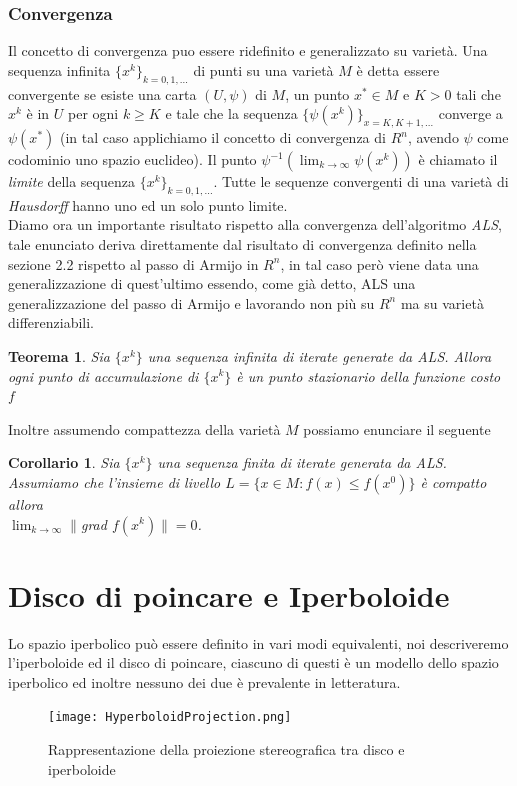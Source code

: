 \documentclass[a4paper, 12pt]{article}
\newtheorem{theorem}{Teorema}
\newtheorem{corollary}{Corollario}
\begin{document}
\subsubsection{Convergenza}
Il concetto di convergenza puo essere ridefinito e generalizzato su varietà. Una sequenza infinita $\{x^k\}_{k=0,1,...}$ di punti su una varietà $M$ è detta essere convergente se esiste una carta $(U, \psi)$ di $M$, un punto $x^\ast \in M$ e $K > 0$ tali che $x^k$ è in $U$ per ogni $k \geq K$ e tale che la sequenza $\{\psi(x^k)\}_{x=K, K+1, ...}$ converge a $\psi(x^\ast)$ (in tal caso applichiamo il concetto di convergenza di $R^n$, avendo $\psi$ come codominio uno spazio euclideo). Il punto $\psi^{-1}(\lim_{k \to \infty} \psi(x^k))$ è chiamato il \emph{limite} della sequenza $\{x^k\}_{k=0,1,...}$. Tutte le sequenze convergenti di una varietà di \emph{Hausdorff} hanno uno ed un solo punto limite.\\
Diamo ora un importante risultato rispetto alla convergenza dell'algoritmo \emph{ALS}, tale enunciato deriva direttamente dal risultato di convergenza definito nella sezione 2.2 rispetto al passo di Armijo in $R^n$, in tal caso però viene data una generalizzazione di quest'ultimo essendo, come già detto, ALS una generalizzazione del passo di Armijo e lavorando non più su $R^n$ ma su varietà differenziabili.
\begin{theorem}
Sia $\{x^k\}$ una sequenza infinita di iterate generate da ALS. Allora ogni punto di accumulazione  di $\{x^k\}$ è un punto stazionario della funzione costo $f$
\end{theorem}
Inoltre assumendo compattezza della varietà $M$ possiamo enunciare il seguente
\begin{corollary}
Sia $\{x^k\}$ una sequenza finita di iterate generata da ALS. Assumiamo che l'insieme di livello $L = \{x \in M : f(x) \leq f(x^0)\}$ è compatto allora\\ $\lim_{k \to \infty} \parallel $grad $f(x^k) \parallel = 0$.
\end{corollary}

\section{Disco di poincare e Iperboloide}
Lo spazio iperbolico può essere definito in vari modi equivalenti, noi descriveremo l'iperboloide ed il disco di poincare, ciascuno di questi è un modello dello spazio iperbolico ed inoltre nessuno dei due è prevalente in letteratura.\\
\begin{figure}[t] %
    \centering\texttt{[image: HyperboloidProjection.png]}
    \caption{Rappresentazione della proiezione stereografica tra disco e iperboloide}
\end{figure}
\end{document}
